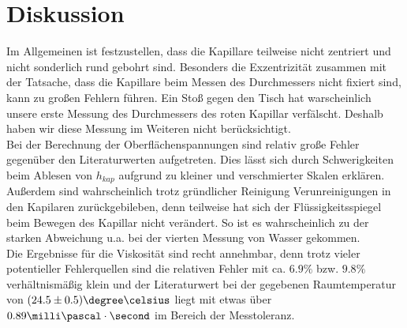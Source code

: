 \documentclass[12pt, a4paper, twoside]{scrartcl}
\begin{document}
\section{Diskussion}
\label{sec:diskussion}
Im Allgemeinen ist festzustellen, dass die Kapillare teilweise nicht zentriert und nicht sonderlich rund gebohrt sind. Besonders die Exzentrizität zusammen mit der Tatsache, dass die Kapillare beim Messen des Durchmessers nicht fixiert sind, kann zu großen Fehlern führen. Ein Stoß gegen den Tisch hat warscheinlich unsere erste Messung des Durchmessers des roten Kapillar verfälscht. Deshalb haben wir diese Messung im Weiteren nicht berücksichtigt.
\\
Bei der Berechnung der Oberflächenspannungen sind relativ große Fehler gegenüber den Literaturwerten aufgetreten. Dies lässt sich durch Schwerigkeiten beim Ablesen von $h_{kap}$ aufgrund zu kleiner und verschmierter Skalen erklären. Außerdem sind wahrscheinlich trotz gründlicher Reinigung Verunreinigungen in den Kapilaren zurückgebileben, denn teilweise hat sich der Flüssigkeitsspiegel beim Bewegen des Kapillar nicht verändert. So ist es wahrscheinlich zu der starken Abweichung u.a. bei der vierten Messung von Wasser gekommen.  
\\
Die Ergebnisse für die Viskosität sind recht annehmbar, denn trotz vieler potentieller Fehlerquellen sind die relativen Fehler mit ca. $6.9\%$ bzw. $9.8\%$ verhältnismäßig klein und der Literaturwert bei der gegebenen Raumtemperatur von $(24.5\pm0.5) \degree\celsius$ liegt mit etwas über $0.89 \milli\pascal\cdot\second$ im Bereich der Messtoleranz.
\end{document}
